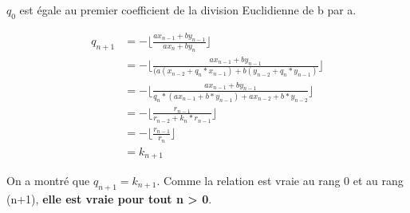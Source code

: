 $q_0$ est égale au premier coefficient de la division Euclidienne de b par a.

\begin{align*}
q_{n+1} &= - \lfloor\frac{a x_{n-1} + b y_{n-1}}{ a x_{n} + b y_{n}}\rfloor \\
        &= - \lfloor\frac{a x_{n-1} + b y_{n-1}}{ (a (x_{n-2} + q_n * x_{n-1}) + b (y_{n-2} + q_n * y_{n-1})}\rfloor \\
        &= - \lfloor\frac{a x_{n-1} + b y_{n-1}}{ q_n*(a x_{n-1} + b*y_{n-1} ) + a x_{n-2} + b*y_{n-2}  }\rfloor \\
        &= - \lfloor\frac{r_{n-1}              }{ r_{n-2} + k_n * r_{n-1}}\rfloor \\
        &= - \lfloor\frac{r_{n-1}              }{ r_{n} }\rfloor \\
        &= k_{n+1}
\end{align*}

On a montré que \textbf{$q_{n+1}= k_{n+1}$}. Comme la relation est vraie au rang 0 et au rang (n+1),  \textbf{elle est vraie pour tout n > 0}.



